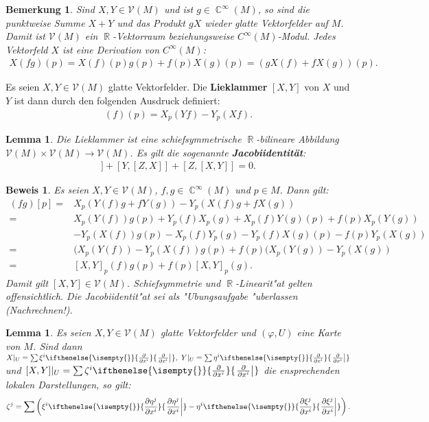 \documentclass[paper=A4, twoside, chapterprefix=true, bibliography=totoc, headsepline]{scrbook}
\let\temp\phi{}
\let\phi\varphi{}
\let\varphi\temp{}
\let\temp\theta{}
\let\theta\vartheta{}
\let\vartheta\temp{}
\let\temp\epsilon{}
\let\epsilon\varepsilon{}
\let\varepsilon\temp{}
\let\temp\rho{}
\let\rho\varrho{}
\let\varrho\temp{}
\DeclareMathOperator{\C}{\mathbb{C}}
\DeclareMathOperator{\R}{\mathbb{R}}
\newcommand{\pdifffrac}[3][]{\ifthenelse{\isempty{#1}}{\frac{\partial #2}{\partial #3}}{\left. \frac{\partial #2}{\partial #3} \right|_{#1}}}
\theoremstyle{plain}
\newtheorem{Lemma}[Dfn]{Lemma}
\theoremstyle{nonumberplain}
\newtheorem{bem}{Bemerkung}
\newtheorem{bew}{Beweis}
\theoremstyle{empty}
\theoremstyle{break}
\newcommand{\CmIndex}[2][]{\ifthenelse{\isempty{#1}}{\index{#2}}{\index{#1}}#2}
\newcommand{\CmMark}[2][]{\textbf{\CmIndex[#1]{#2}}}
\begin{document}
\begin{bem}
  Sind $X,Y \in \mathcal V(M)$ und ist $g \in \C^{\infty}(M)$, so sind die punktweise Summe $X+Y$ und das Produkt $gX$ wieder glatte Vektorfelder auf $M$. Damit ist $\mathcal V(M)$ ein $\R$-Vektorraum beziehungsweise $C^{\infty}(M)$-Modul.
  Jedes Vektorfeld $X$ ist eine Derivation von $C^{\infty}(M)$:
  \begin{align*}
    X(fg)(p) = X(f)(p)g(p) + f(p) X(g)(p) = \left(gX(f) + fX(g)\right)(p).
  \end{align*}
\end{bem}

Es seien $X,Y \in \mathcal V(M)$ glatte Vektorfelder. Die \CmMark{Lieklammer} $[X,Y]$ von $X$ und $Y$ ist dann durch den folgenden Ausdruck definiert:
\begin{align*}
  [X,Y](f)(p) = X_p(Yf)-Y_p(Xf).
\end{align*}

\begin{Lemma}
  Die Lieklammer ist eine schiefsymmetrische $\R$-bilineare Abbildung $\mathcal V(M) \times \mathcal V(M) \to \mathcal V(M)$. Es gilt die sogenannte \CmMark{Jacobiidentit\"at}:
  \begin{align*}
    [X,[Y,Z]] + [Y,[Z,X]] + [Z,[X,Y]] = 0.
  \end{align*}
\end{Lemma}

\begin{bew}
  Es seien $X,Y \in \mathcal V(M)$, $f,g \in \C^{\infty}(M)$ und $p \in M$. Dann gilt:
  \begin{align*}
    [X,Y](fg)[p]  ={} & X_p(Y(f)g + fY(g)) - Y_p(X(f)g+fX(g))\\
    ={} & X_p(Y(f))g(p) + Y_p(f)X_p(g) + X_p(f)Y(g)(p) + f(p)X_p(Y(g))\\
    & - Y_p(X(f))g(p) - X_p(f)Y_p(g) - Y_p(f)X(g)(p) - f(p)Y_p(X(g))\\
    ={} & (X_p(Y(f))-Y_p(X(f))g(p) + f(p)(X_p(Y(g))-Y_p(X(g))\\
    ={} & [X,Y]_p (f)g(p) + f(p)[X,Y]_p(g).
  \end{align*}
  Damit gilt $[X,Y] \in \mathcal V(M)$. Schiefsymmetrie und $\R$-Linearit"at gelten offensichtlich. Die Jacobiidentit"at sei als "Ubungsaufgabe "uberlassen (Nachrechnen!).
\end{bew}


\begin{Lemma}
  Es seien $X,Y \in \mathcal V(M)$ glatte Vektorfelder und $(\phi,U)$ eine Karte von $M$.
  Sind dann $X|_U = \sum \xi^i\pdifffrac{}{x^i}, \ Y|_U = \sum \eta^i \pdifffrac{}{x^i}$ und $[X,Y]|_U = \sum \zeta^i \pdifffrac{}{x^i}$ die ensprechenden lokalen Darstellungen, so gilt:
  \begin{align*}
    \zeta^j = \sum \left(\xi^i\pdifffrac{\eta^j}{x^i} - \eta^i \pdifffrac{\xi^j}{x^i} \right).
  \end{align*}
\end{Lemma} 
\end{document}
